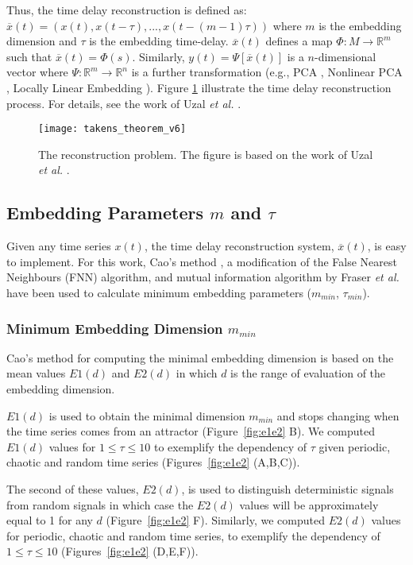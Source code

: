 \documentclass[10pt,journal,compsoc]{IEEEtran}
\begin{document}
Thus, the time delay reconstruction is defined as:
$\overline{x}(t) = (x(t), x(t-\tau),...,x(t-(m-1)\tau))$ 
where $m$ is the embedding dimension and $\tau$ is the embedding time-delay.
$\overline{x}(t)$ defines a map $\varPhi: M \rightarrow \mathbb{R}^m$ such that 
$\overline{x}(t) = \varPhi(s)$.
Similarly, $y(t)= \varPsi [\overline{x}(t)]$ is a $n$-dimensional vector 
where $\varPsi: \mathbb{R}^m \rightarrow \mathbb{R}^n$ is a further transformation 
(e.g., PCA \cite{Shlens2014}, Nonlinear PCA \cite{Kruger2007}, 
Locally Linear Embedding \cite{Roweis2000}). Figure \ref{fig:takens_theorem} 
illustrate the time delay reconstruction process.
For details, see the work of Uzal \emph{et al.} \cite{Uzal2011}.

\begin{figure}[!htb]
\centering    
 \texttt{[image: takens\_theorem\_v6]}
\caption[PA]{The reconstruction problem. The figure is based on the work of Uzal 
\emph{et al.} \cite{Uzal2011}.}
\label{fig:takens_theorem}
\end{figure}

\subsection{Embedding Parameters $m$ and $\tau$}
Given any time series $x(t)$, the time delay reconstruction system, $\overline{x}(t)$,
is easy to implement. For this work, Cao's method \cite{Cao1997}, a modification of the 
False Nearest Neighbours (FNN) algorithm, and mutual information algorithm by 
Fraser \emph{et al.} \cite{Fraser1986} have been used to calculate minimum embedding 
parameters ($m_{min}$, $\tau_{min}$).

\subsubsection{Minimum Embedding Dimension $m_{min}$}
Cao's method \cite{Cao1997} for computing the minimal embedding dimension is based on the mean values 
$E1(d)$ and $E2(d)$ in which $d$ is the range of evaluation of the embedding dimension.

$E1(d)$ is used to obtain the minimal dimension $m_{min}$ and stops changing 
when the time series comes from an attractor (Figure~\ref{fig:e1e2} B).
We computed $E1(d)$ values for $1 \leq \tau \leq 10$ to exemplify 
the dependency of $\tau$ given periodic, chaotic and random time series
(Figures~\ref{fig:e1e2} (A,B,C)).

The second of these values, $E2(d)$, is used to distinguish 
deterministic signals from random signals in which case the $E2(d)$ values will be approximately 
equal to 1 for any $d$ (Figure~\ref{fig:e1e2} F).
Similarly, we computed $E2(d)$ values for periodic, chaotic and random time series,
to exemplify the dependency of $1 \leq \tau \leq 10$ (Figures~\ref{fig:e1e2} (D,E,F)).
\end{document}
